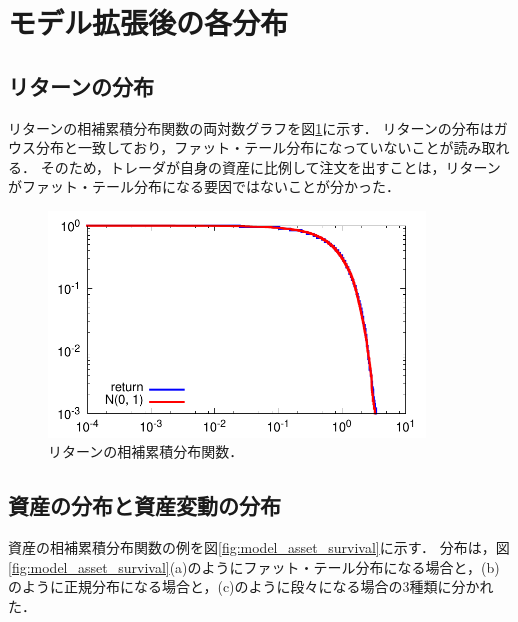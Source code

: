 \documentclass[titlepage]{jsreport}
\begin{document}
\section{モデル拡張後の各分布}\label{chap:model}
\subsection{リターンの分布}\label{chap:model_return}
リターンの相補累積分布関数の両対数グラフを図\ref{fig:model_return}に示す．
リターンの分布はガウス分布と一致しており，ファット・テール分布になっていないことが読み取れる．
そのため，トレーダが自身の資産に比例して注文を出すことは，リターンがファット・テール分布になる要因ではないことが分かった．

\begin{figure}
    \centering
    \includegraphics[width=10cm]{fig/return_survival.pdf}
    \caption{リターンの相補累積分布関数．}
    \label{fig:model_return}
\end{figure}

\subsection{資産の分布と資産変動の分布}\label{chap:model_asset}
資産の相補累積分布関数の例を図\ref{fig:model_asset_survival}に示す．
分布は，図\ref{fig:model_asset_survival}(a)のようにファット・テール分布になる場合と，(b)のように正規分布になる場合と，(c)のように段々になる場合の3種類に分かれた．
\end{document}
